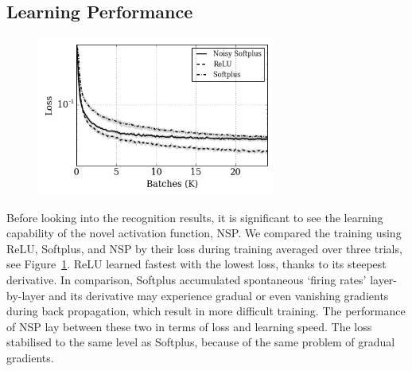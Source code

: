 	\subsection{Learning Performance}
	\label{subsec:result_compare}
	\DIFaddbegin \begin{figure}[tbp!]
		\centering
		\includegraphics[width=0.7\textwidth]{pics_iconip/8.png}
		\caption[Comparisons of loss during training.]{}
		\label{Fig:loss_ns}
	\end{figure}
	\DIFaddend Before looking into the recognition results, it is significant to see the learning capability of the novel activation function, NSP.
	We compared the training using ReLU, Softplus, and NSP by their loss during training averaged over three trials, see Figure~\ref{Fig:loss_ns}.
	ReLU learned fastest with the lowest loss, thanks to its steepest derivative.
	In comparison, Softplus accumulated spontaneous `firing rates' layer-by-layer and its derivative may experience gradual or even vanishing gradients during back propagation, which result in more difficult training.
	The performance of NSP lay between these two in terms of loss and learning speed.
	The loss stabilised to the same level as Softplus, because of the same problem of gradual gradients.

